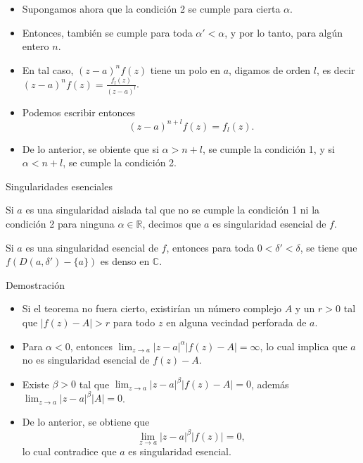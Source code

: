 \documentclass[spanish,presentation]{beamer}
\begin{document}
\begin{frame}[label=sec-2-3]{}
\begin{itemize}
\item Supongamos ahora que la condición 2 se cumple para cierta \(\alpha\).
\item Entonces, también se cumple para toda \(\alpha'<\alpha\), y por
lo tanto, para algún entero \(n\).
\item En tal caso, \((z-a)^{n}f(z)\) tiene un polo en \(a\), digamos
de orden \(l\), es decir \((z-a)^{n}f(z)=\frac{f_{l}(z)}{(z-a)^{l}}\).
\item Podemos escribir entonces
\begin{displaymath}
(z-a)^{n+l}f(z)=f_{l}(z).
\end{displaymath}
\item De lo anterior, se obiente que si \(\alpha>n+l\), se cumple la condición
1, y si \(\alpha<n+l\), se cumple la condición 2.
\end{itemize}
\end{frame}

\begin{frame}[label=sec-2-4]{Singularidades esenciales}
\begin{definition}
Si \(a\) es una singularidad aislada tal que no se cumple la
condición 1 ni la condición 2 para ninguna \(\alpha\in
    \mathbb{R}\), decimos que \(a\) es \alert{singularidad esencial} de \(f\).
\end{definition}

\begin{theorem}
Si \(a\) es una singularidad esencial de \(f\), entonces para toda
\(0<\delta'<\delta\), se tiene que \(f(D(a,\delta')-\{a\})\) es
denso en \(\mathbb{C}\).
\end{theorem}
\end{frame}

\begin{frame}[label=sec-2-5]{Demostración}
\begin{itemize}
\item Si el teorema no fuera cierto, existirían un número complejo
\(A\) y un \(r>0\) tal que \(|f(z)-A|>r\) para todo \(z\) en
alguna vecindad perforada de \(a\).
\item Para \(\alpha<0\), entonces \(\lim_{z\to
     a}|z-a|^{\alpha}|f(z)-A|=\infty\), lo cual implica que \(a\) no
es singularidad esencial de \(f(z)-A\).
\item Existe \(\beta>0\) tal que \(\lim_{z\to
     a}|z-a|^{\beta}|f(z)-A|=0\), además \(\lim_{z\to a}|z-a|^{\beta}|A|=0\).
\item De lo anterior, se obtiene que
\begin{displaymath}
\lim_{z\to a}|z-a|^{\beta}|f(z)|=0,
\end{displaymath}
lo cual contradice que \(a\) es singularidad esencial.
\end{itemize}
\end{frame}
\end{document}
